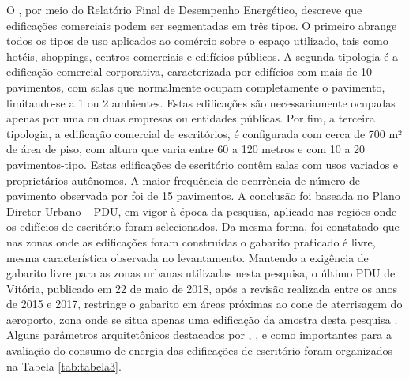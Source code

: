 O \textcite{ConselhoBrasileirodeConstrucaoSustentavel-CBCS2015}, por meio do Relatório Final de Desempenho Energético, descreve que edificações comerciais podem ser segmentadas em três tipos. O primeiro abrange todos os tipos de uso aplicados ao comércio sobre o espaço utilizado, tais como hotéis, shoppings, centros comerciais e edifícios públicos. A segunda tipologia é a edificação comercial corporativa, caracterizada por edifícios com mais de 10 pavimentos, com salas que normalmente ocupam completamente o pavimento, limitando-se a 1 ou 2 ambientes. Estas edificações são necessariamente ocupadas apenas por uma ou duas empresas ou entidades públicas. Por fim, a terceira tipologia, a edificação comercial de escritórios, é configurada com cerca de 700 m² de área de piso, com altura que varia entre 60 a 120 metros e com 10 a 20 pavimentos-tipo. Estas edificações de escritório contêm salas com usos variados e proprietários autônomos.\vspace*{0.3cm}\newline
A maior frequência de ocorrência de número de pavimento observada por \textcite{Bernabe2012} foi de 15 pavimentos. A conclusão foi baseada no Plano Diretor Urbano – PDU, em vigor à época da pesquisa, aplicado nas regiões onde os edifícios de escritório foram selecionados. Da mesma forma, foi constatado que nas zonas onde as edificações foram construídas o gabarito praticado é livre, mesma característica observada no levantamento. Mantendo a exigência de gabarito livre para as zonas urbanas utilizadas nesta pesquisa, o último PDU de Vitória, publicado em 22 de maio de 2018, após a revisão realizada entre os anos de 2015 e 2017, restringe o gabarito em áreas próximas ao cone de aterrisagem do aeroporto, zona onde se situa apenas uma edificação da amostra desta pesquisa \cite{PrefeituraMunicipaldeVitoria-PMV2018}.\vspace*{0.3cm}\newline
Alguns parâmetros arquitetônicos destacados por \textcite{Lamberts2006}, \textcite{Bernabe2012}, e \textcite{Fonseca2016} como importantes para a avaliação do consumo de energia das edificações de escritório foram organizados na Tabela \ref{tab:tabela3}.\newline \vspace{-0.25cm}
